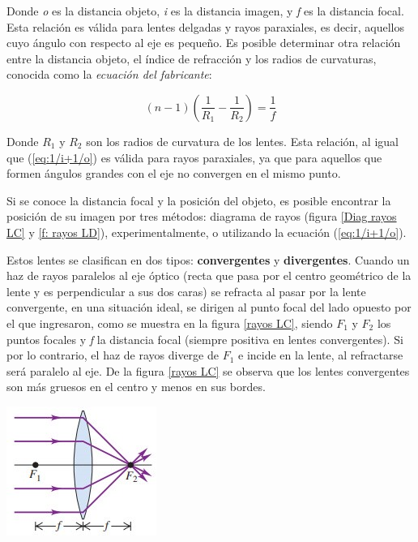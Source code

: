 \documentclass[a4paper,12pt]{article}
\newenvironment{Figure}
  {\par\medskip\noindent\minipage{\linewidth}}
  {\endminipage\par\medskip}
\begin{document}
\begin{multicols*}{2}
    Donde \textit{o} es la distancia objeto, \textit{i} es la distancia imagen, y \textit{f} es la distancia focal. Esta relación es válida para lentes delgadas y rayos paraxiales, es decir, aquellos cuyo ángulo con respecto al eje es pequeño. Es posible determinar otra relación entre la distancia objeto, el índice de refracción y los radios de curvaturas, conocida como la \textit{ecuación del fabricante}:

    \begin{equation*}
        (n-1) \left(\frac{1}{R_{1}}-\frac{1}{R_{2}} \right)=\frac{1}{f}
    \end{equation*}

    Donde $R_{1}$ y $R_{2}$ son los radios de curvatura de los lentes. Esta relación, al igual que (\ref{eq:1/i+1/o}) es válida para rayos paraxiales, ya que para aquellos que formen ángulos grandes con el eje no convergen en el mismo punto.

    Si se conoce la distancia focal y la posición del objeto, es posible encontrar la posición de su imagen por tres métodos: diagrama de rayos (figura \ref{Diag rayos LC} y \ref{f: rayos LD}), experimentalmente, o utilizando la ecuación (\ref{eq:1/i+1/o}).

    Estos lentes se clasifican en dos tipos: \textbf{convergentes} y \textbf{divergentes}. Cuando un haz de rayos paralelos al eje óptico (recta que pasa por el centro geométrico de la lente y es perpendicular a sus dos caras) se refracta al pasar por la lente convergente, en una situación ideal, se dirigen al punto focal del lado opuesto por el que ingresaron, como se muestra en la figura \ref{rayos LC}, siendo $F_{1}$ y $F_{2}$ los puntos focales y \emph{f} la distancia focal (siempre positiva en lentes convergentes). Si por lo contrario, el haz de rayos diverge de $F_{1}$ e incide en la lente, al refractarse será paralelo al eje. De la figura \ref{rayos LC} se observa que los lentes convergentes son más gruesos en el centro y menos en sus bordes.

    \begin{Figure}
        \centering
        \includegraphics[width=0.6\linewidth]{LenteConvergente1.jpg}
        \label{rayos LC}
    \end{Figure}


\end{multicols*}
\end{document}
